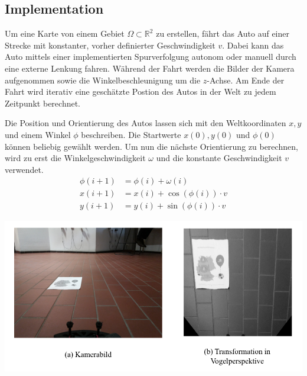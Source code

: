 \subsection{Implementation}

Um eine Karte von einem Gebiet $ \Omega \subset \mathbb{R}^2$ zu erstellen, fährt das Auto auf einer Strecke mit konstanter, vorher definierter Geschwindigkeit $v$. Dabei kann das Auto mittels einer implementierten Spurverfolgung autonom oder manuell durch eine externe Lenkung fahren. Während der Fahrt werden die Bilder der Kamera aufgenommen sowie die Winkelbeschleunigung um die $z$-Achse. Am Ende der Fahrt wird iterativ eine geschätzte Postion des Autos in der Welt zu jedem Zeitpunkt berechnet.

Die Position und Orientierung des Autos lassen sich mit den Weltkoordinaten $x,y$ und einem Winkel $\phi$ beschreiben. Die Startwerte $x(0),y(0)$ und $\phi(0)$ können beliebig gewählt werden. Um nun die nächste Orientierung zu berechnen, wird zu erst die Winkelgeschwindigkeit $\omega$ und die konstante Geschwindigkeit $v$ verwendet.
$$
\begin{aligned}
\phi(i+1)&=\phi(i)+\omega(i)\\
x(i+1)&=x(i)+\cos(\phi(i))\cdot v\\
y(i+1)&=y(i)+\sin(\phi(i))\cdot v
\end{aligned}
$$

\hspace{-12mm}
\includegraphics[scale=1]{vogel.png}


